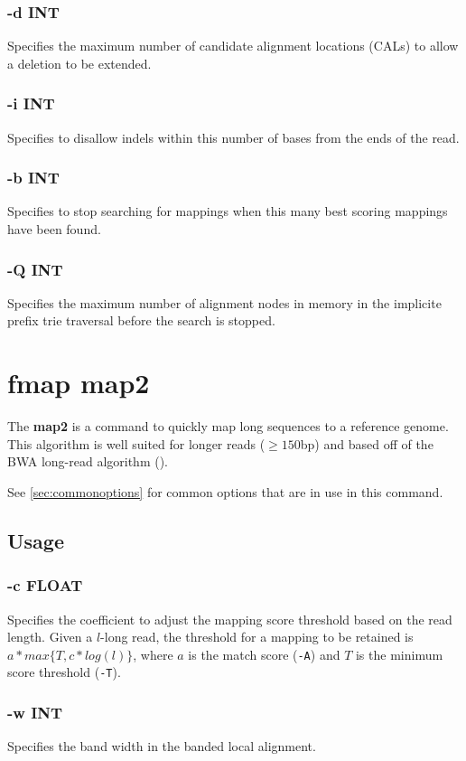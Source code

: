 \documentclass[a4paper,12pt]{book}
\newcommand{\TT}[1]{{\tt #1}} %
\newcommand{\BF}[1]{{\bf #1}} %
\begin{document}
\subsubsection{-d INT}
Specifies the maximum number of candidate alignment locations (CALs) to allow a deletion to be extended.

\subsubsection{-i INT}
Specifies to disallow indels within this number of bases from the ends of the read.

\subsubsection{-b INT}
Specifies to stop searching for mappings when this many best scoring mappings have been found.

\subsubsection{-Q INT}
Specifies the maximum number of alignment nodes in memory in the implicite prefix trie traversal before the search is stopped.

\section{fmap map2}
\label{sec:map2}
The \BF{map2} is a command to quickly map long sequences to a reference genome.
This algorithm is well suited for longer reads ($\geq 150$bp) and based off of the BWA long-read algorithm (\cite{BWA-long}).

See \autoref{sec:commonoptions} for common options that are in use in this command.

\subsection{Usage}

\subsubsection{-c FLOAT}
Specifies the coefficient to adjust the mapping score threshold based on the read length.
Given a $l$-long read, the threshold for a mapping to be retained is $a*max\{T,c*log(l)\}$, where $a$ is the match score (\TT{-A}) and $T$ is the minimum score threshold (\TT{-T}).

\subsubsection{-w INT}
Specifies the band width in the banded local alignment.
\end{document}
